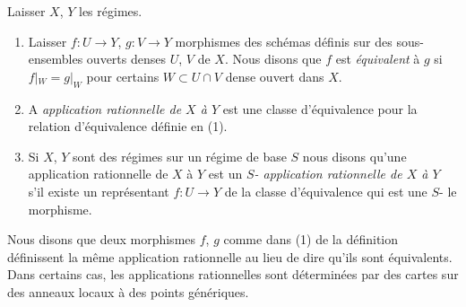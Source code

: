 \begin{definition}

\label{definition-rational-map}

Laisser $X$, $Y$ les régimes.

\begin{enumerate}

\item Laisser $f : U \to Y$, $g : V \to Y$ morphismes des schémas définis sur des sous-ensembles ouverts denses $U$, $V$ de $X$. Nous disons que $f$ est {\it équivalent} à $g$ si $f|_W = g|_W$ pour certains $W \subset U \cap V$
dense ouvert dans $X$.
\item A {\it application rationnelle de $X$ à $Y$} est une classe d'équivalence pour la relation d'équivalence définie en (1).
\item Si $X$, $Y$ sont des régimes sur un régime de base $S$ nous disons qu'une application rationnelle de $X$ à $Y$ est un {\it  $S$- application rationnelle de $X$
à $Y$} s'il existe un représentant $f : U \to Y$ de la classe d'équivalence qui est une $S$- le morphisme.

\end{enumerate}

\end{definition}

\noindent
Nous disons que deux morphismes $f$, $g$ comme dans (1) de la définition définissent la même application rationnelle au lieu de dire qu'ils sont équivalents. Dans certains cas, les applications rationnelles sont déterminées par des cartes sur des anneaux locaux à des points génériques.

